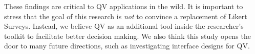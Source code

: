 These findings are critical to QV applications in the wild. It is important to stress that the goal of this research is \textit{not} to convince a replacement of Likert Surveys. Instead, we believe QV as an additional tool inside the researcher's toolkit to facilitate better decision making. We also think this study opens the door to many future directions, such as investigating interface designs for QV.









